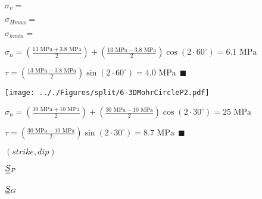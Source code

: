 \documentclass[onecolumn,11pt]{report}
\def\lthtmlcheckvsize{\ifdim\ht\sizebox<\vsize 
  \ifdim\wd\sizebox<\hsize\expandafter\hfill\fi \expandafter\vfill
  \else\expandafter\vss\fi}%
\begin{document}
{\newpage\clearpage
{}%
$ \sigma_v =$%
\lthtmlindisplaymathZ
\lthtmlcheckvsize\clearpage}

{\newpage\clearpage
{}%
$ \sigma_{Hmax} =$%
\lthtmlindisplaymathZ
\lthtmlcheckvsize\clearpage}

{\newpage\clearpage
{}%
$ \sigma_{hmin} =$%
\lthtmlindisplaymathZ
\lthtmlcheckvsize\clearpage}

{\newpage\clearpage
{}%
$\displaystyle \sigma_n = \left( \frac{13 \text{ MPa} + 3.8 \text{ MPa}}{2} \right) + \left( \frac{13 \text{ MPa} - 3.8 \text{ MPa}}{2} \right) \cos(2 \cdot 60^{\circ}) = 6.1 \text{ MPa}
$%
\lthtmlindisplaymathZ
\lthtmlcheckvsize\clearpage}

{\newpage\clearpage
{}%
$\displaystyle \tau = \left( \frac{13 \text{ MPa} - 3.8 \text{ MPa}}{2} \right) \sin(2 \cdot 60^{\circ}) = 4.0 \text{ MPa} 
	\: \: \blacksquare
$%
\lthtmlindisplaymathZ
\lthtmlcheckvsize\clearpage}

{\newpage\clearpage
{}%
\texttt{[image: .././Figures/split/6-3DMohrCircleP2.pdf]}%
\lthtmlpictureZ
\lthtmlcheckvsize\clearpage}

{\newpage\clearpage
{}%
$\displaystyle \sigma_n = \left( \frac{30 \text{ MPa} + 10 \text{ MPa}}{2} \right) + \left( \frac{30 \text{ MPa} - 10 \text{ MPa}}{2} \right) \cos(2 \cdot 30^{\circ}) = 25 \text{ MPa}
$%
\lthtmlindisplaymathZ
\lthtmlcheckvsize\clearpage}

{\newpage\clearpage
{}%
$\displaystyle \tau = \left( \frac{30 \text{ MPa} - 10 \text{ MPa}}{2} \right) \sin(2 \cdot 30^{\circ}) = 8.7 \text{ MPa} 
	\: \: \blacksquare
$%
\lthtmlindisplaymathZ
\lthtmlcheckvsize\clearpage}

{\newpage\clearpage
{}%
$ (strike,dip)$%
\lthtmlindisplaymathZ
\lthtmlcheckvsize\clearpage}

{\newpage\clearpage
{}%
$ \uuline{S}{}_P$%
\lthtmlindisplaymathZ
\lthtmlcheckvsize\clearpage}

{\newpage\clearpage
{}%
$ \uuline{S}{}_G$%
\lthtmlindisplaymathZ
\lthtmlcheckvsize\clearpage}
\end{document}
